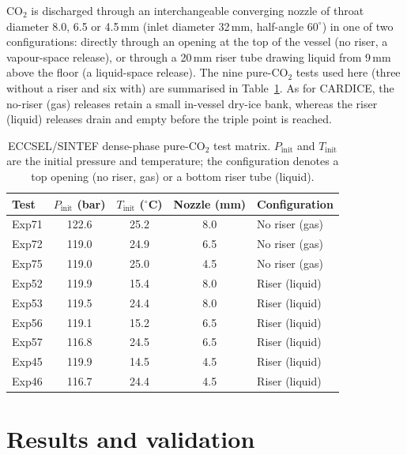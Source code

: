 \documentclass[5p,authoryear]{elsarticle}
\begin{document}
CO$_2$ is discharged through an interchangeable converging nozzle of throat diameter 8.0, 6.5 or
4.5\,mm (inlet diameter 32\,mm, half-angle $60^\circ$) in one of two configurations: directly
through an opening at the top of the vessel (no riser, a vapour-space release), or through a
20\,mm riser tube drawing liquid from 9\,mm above the floor (a liquid-space release). The nine
pure-CO$_2$ tests used here (three without a riser and six with) are summarised in
Table~\ref{tab:sintef-matrix}. As for CARDICE, the no-riser (gas) releases retain a small
in-vessel dry-ice bank, whereas the riser (liquid) releases drain and empty before the triple
point is reached.

\begin{table}[!tbh]
\centering
\caption{ECCSEL/SINTEF dense-phase pure-CO$_2$ test matrix. $P_\text{init}$ and $T_\text{init}$ are the initial pressure
and temperature; the configuration denotes a top opening (no riser, gas) or a bottom riser tube
(liquid).}
\label{tab:sintef-matrix}
\begin{tabular}{lcccl}
\toprule
Test & $P_\text{init}$ (bar) & $T_\text{init}$ ($^\circ$C) & Nozzle (mm) & Configuration \\
\midrule
Exp71 & 122.6 & 25.2 & 8.0 & No riser (gas) \\
Exp72 & 119.0 & 24.9 & 6.5 & No riser (gas) \\
Exp75 & 119.0 & 25.0 & 4.5 & No riser (gas) \\
Exp52 & 119.9 & 15.4 & 8.0 & Riser (liquid) \\
Exp53 & 119.5 & 24.4 & 8.0 & Riser (liquid) \\
Exp56 & 119.1 & 15.2 & 6.5 & Riser (liquid) \\
Exp57 & 116.8 & 24.5 & 6.5 & Riser (liquid) \\
Exp45 & 119.9 & 14.5 & 4.5 & Riser (liquid) \\
Exp46 & 116.7 & 24.4 & 4.5 & Riser (liquid) \\
\bottomrule
\end{tabular}
\end{table}


\section{Results and validation}
\label{sec:results}
\end{document}
